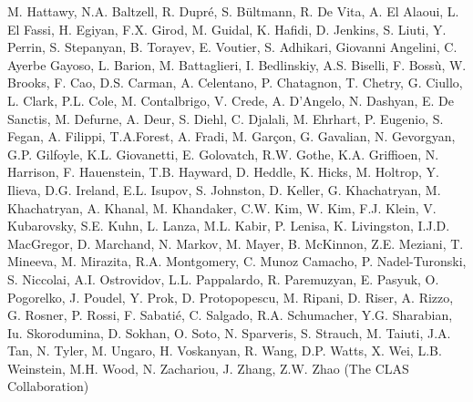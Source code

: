 M. Hattawy, N.A. Baltzell, R. Dupr\'{e}, S. B\"{u}ltmann, R. De Vita, A. El Alaoui, L. El Fassi, H. Egiyan, F.X. Girod, M. Guidal, K. Hafidi, D. Jenkins, S. Liuti, Y. Perrin, S. Stepanyan, B. Torayev, E. Voutier, S. Adhikari, Giovanni Angelini, C. Ayerbe Gayoso, L. Barion, M. Battaglieri, I. Bedlinskiy, A.S. Biselli, F. Boss\`u, W. Brooks, F. Cao, D.S. Carman, A. Celentano, P. Chatagnon, T. Chetry, G. Ciullo, L. Clark, P.L. Cole, M. Contalbrigo, V. Crede, A. D'Angelo, N. Dashyan, E. De Sanctis, M. Defurne, A. Deur, S. Diehl, C. Djalali, M. Ehrhart, P. Eugenio, S. Fegan, A. Filippi, T.A.Forest, A. Fradi, M. Gar\c{c}on, G. Gavalian, N. Gevorgyan, G.P. Gilfoyle, K.L. Giovanetti, E. Golovatch, R.W. Gothe, K.A. Griffioen, N. Harrison, F. Hauenstein, T.B. Hayward, D. Heddle, K. Hicks, M. Holtrop, Y. Ilieva, D.G. Ireland, E.L. Isupov, S. Johnston, D. Keller, G. Khachatryan, M. Khachatryan, A. Khanal, M. Khandaker, C.W. Kim, W. Kim, F.J. Klein, V. Kubarovsky, S.E. Kuhn, L. Lanza, M.L. Kabir, P. Lenisa, K. Livingston, I.J.D. MacGregor, D. Marchand, N. Markov, M. Mayer, B. McKinnon, Z.E. Meziani, T. Mineeva, M. Mirazita, R.A. Montgomery, C. Munoz Camacho, P. Nadel-Turonski, S. Niccolai, A.I. Ostrovidov, L.L. Pappalardo, R. Paremuzyan, E. Pasyuk, O. Pogorelko, J. Poudel, Y. Prok, D. Protopopescu, M. Ripani, D. Riser, A. Rizzo, G. Rosner, P. Rossi, F. Sabati\'e, C. Salgado, R.A. Schumacher, Y.G. Sharabian, Iu. Skorodumina, D. Sokhan, O. Soto, N. Sparveris, S. Strauch, M. Taiuti, J.A. Tan, N. Tyler, M. Ungaro, H. Voskanyan, R. Wang, D.P. Watts, X. Wei, L.B. Weinstein, M.H. Wood, N. Zachariou, J. Zhang, Z.W. Zhao (The CLAS Collaboration)

